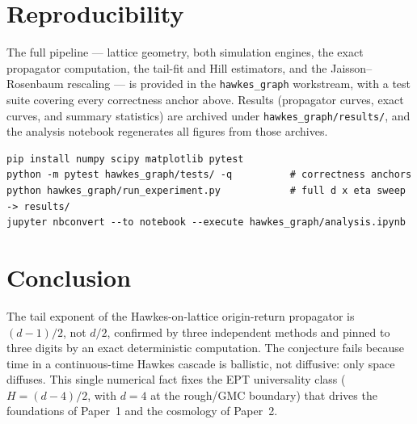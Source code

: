 \documentclass[11pt,a4paper]{article}
\begin{document}
\section{Reproducibility}

The full pipeline --- lattice geometry, both simulation engines, the exact propagator computation, the tail-fit and Hill estimators, and the Jaisson--Rosenbaum rescaling --- is provided in the \texttt{hawkes\_graph} workstream, with a test suite covering every correctness anchor above. Results (propagator curves, exact curves, and summary statistics) are archived under \texttt{hawkes\_graph/results/}, and the analysis notebook regenerates all figures from those archives.

\begin{verbatim}
pip install numpy scipy matplotlib pytest
python -m pytest hawkes_graph/tests/ -q          # correctness anchors
python hawkes_graph/run_experiment.py            # full d x eta sweep -> results/
jupyter nbconvert --to notebook --execute hawkes_graph/analysis.ipynb
\end{verbatim}

\section{Conclusion}

The tail exponent of the Hawkes-on-lattice origin-return propagator is $(d-1)/2$, not $d/2$, confirmed by three independent methods and pinned to three digits by an exact deterministic computation. The conjecture fails because time in a continuous-time Hawkes cascade is ballistic, not diffusive: only space diffuses. This single numerical fact fixes the EPT universality class ($H=(d-4)/2$, with $d=4$ at the rough/GMC boundary) that drives the foundations of Paper~1 and the cosmology of Paper~2.
\end{document}
